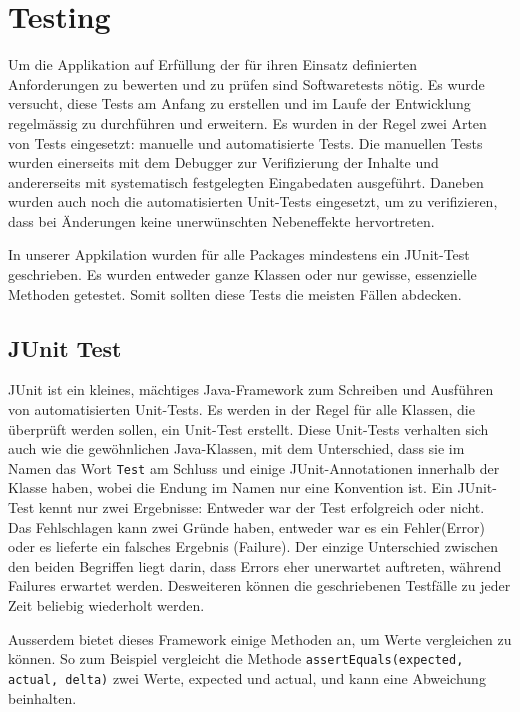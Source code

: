 \section{Testing}
Um die Applikation auf Erfüllung der für ihren Einsatz definierten
Anforderungen zu bewerten und zu prüfen sind Softwaretests nötig. Es wurde
versucht, diese Tests am Anfang zu erstellen und im Laufe der Entwicklung
regelmässig zu durchführen und erweitern. Es wurden in der Regel zwei Arten
von Tests eingesetzt: manuelle und automatisierte Tests. Die manuellen Tests
wurden einerseits mit dem Debugger zur Verifizierung der Inhalte und
andererseits mit systematisch festgelegten Eingabedaten ausgeführt. Daneben
wurden auch noch die automatisierten Unit-Tests eingesetzt, um zu
verifizieren, dass bei Änderungen keine unerwünschten Nebeneffekte
hervortreten. 

In unserer Appkilation wurden für alle Packages mindestens ein JUnit-Test
geschrieben. Es wurden entweder ganze Klassen oder nur gewisse, essenzielle
Methoden getestet. Somit sollten diese Tests die meisten Fällen abdecken. 

\subsection{JUnit Test}
JUnit ist ein kleines, mächtiges Java-Framework zum Schreiben und Ausführen
von automatisierten Unit-Tests. Es werden in der Regel für alle Klassen, die
überprüft werden sollen, ein Unit-Test erstellt. Diese Unit-Tests verhalten
sich auch wie die gewöhnlichen Java-Klassen, mit dem Unterschied, dass sie im
Namen das Wort \texttt{Test} am Schluss und einige JUnit-Annotationen innerhalb der
Klasse haben, wobei die Endung im Namen nur eine Konvention ist. Ein
JUnit-Test kennt nur zwei Ergebnisse: Entweder war der Test erfolgreich oder
nicht. Das Fehlschlagen kann zwei Gründe haben, entweder war es ein
Fehler(Error) oder es lieferte ein falsches Ergebnis (Failure). Der einzige
Unterschied zwischen den beiden Begriffen liegt darin, dass Errors eher
unerwartet auftreten, während Failures erwartet werden. Desweiteren können die
geschriebenen Testfälle zu jeder Zeit beliebig wiederholt werden. 

Ausserdem bietet dieses Framework einige Methoden an, um Werte vergleichen zu
können. So zum Beispiel vergleicht die Methode \texttt{assertEquals(expected, actual,
delta)} zwei Werte, expected und actual, und kann eine Abweichung beinhalten. 

